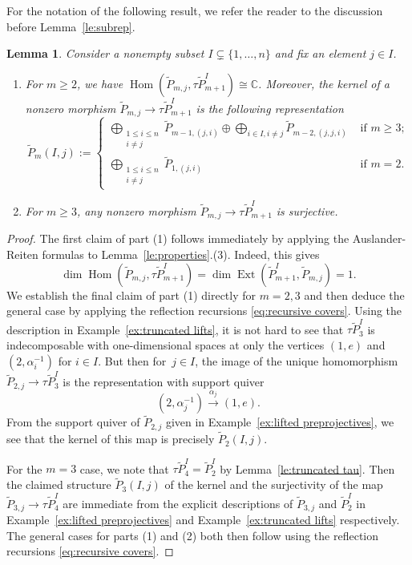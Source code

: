 \documentclass{amsart}
\newtheorem{lemma}[theorem]{Lemma}
\numberwithin{equation}{section}
\newcommand{\CC}{\mathbb{C}}
\newcommand{\Ext}{\operatorname{Ext}}
\newcommand{\Hom}{\operatorname{Hom}}
\begin{document}
For the notation of the following result, we refer the reader to the discussion before Lemma~\ref{le:subrep}.
\begin{lemma}
  \label{le:special subrepresentations}
  Consider a nonempty subset $I\subsetneq\{1,\ldots,n\}$ and fix an element $j\in I$. 
  \begin{enumerate}
    \item For $m\ge2$, we have $\Hom(\tilde P_{m,j},\tau\tilde P_{m+1}^I)\cong\CC$.
      Moreover, the kernel of a nonzero morphism $\tilde P_{m,j}\to\tau\tilde P_{m+1}^I$ is the following representation 
      \[\tilde P_m(I,j):=
        \begin{cases}
          \bigoplus_{\substack{1\leq i\leq n\\i\neq j}}\tilde P_{m-1,(j,i)}\oplus \bigoplus_{i\in I, i\ne j}\tilde P_{m-2,(j,j,i)} & \text{ if $m\geq 3$;}\\
          \bigoplus_{\substack{1\leq i\leq n\\i\neq j}}\tilde P_{1,(j,i)} & \text{ if $m=2$.}
        \end{cases}\]
    \item For $m\ge3$, any nonzero morphism $\tilde P_{m,j}\to\tau\tilde P_{m+1}^I$ is surjective.
  \end{enumerate}
\end{lemma}
\begin{proof}
  The first claim of part (1) follows immediately by applying the Auslander-Reiten formulas \cite[Theorem IV.2.13]{ass} to Lemma~\ref{le:properties}.(3).
  Indeed, this gives
  \[\dim\Hom(\tilde P_{m,j},\tau\tilde P_{m+1}^I)=\dim\Ext(\tilde P_{m+1}^I,\tilde P_{m,j})=1.\]
  We establish the final claim of part (1) directly for $m=2,3$ and then deduce the general case by applying the reflection recursions \eqref{eq:recursive covers}.
  Using the description in Example~\ref{ex:truncated lifts}, it is not hard to see that $\tau\tilde P_3^I$ is indecomposable with one-dimensional spaces at only the vertices $(1,e)$ and $(2,\alpha_i^{-1})$ for $i\in I$.
  But then for~$j\in I$, the image of the unique homomorphism $\tilde P_{2,j}\to\tau\tilde P_3^I$ is the representation with support quiver
  \[(2,\alpha_j^{-1})\xrightarrow{\alpha_j}(1,e).\]
  From the support quiver of $\tilde P_{2,j}$ given in Example~\ref{ex:lifted preprojectives}, we see that the kernel of this map is precisely $\tilde P_2(I,j)$.

  For the $m=3$ case, we note that $\tau\tilde P_4^I=\tilde P_2^I$ by Lemma~\ref{le:truncated tau}.
  Then the claimed structure $\tilde P_3(I,j)$ of the kernel and the surjectivity of the map $\tilde P_{3,j}\to\tau\tilde P_4^I$ are immediate from the explicit descriptions of $\tilde P_{3,j}$ and $\tilde P_2^I$ in Example~\ref{ex:lifted preprojectives} and Example~\ref{ex:truncated lifts} respectively.
  The general cases for parts (1) and (2) both then follow using the reflection recursions \eqref{eq:recursive covers}.
\end{proof}
\end{document}
